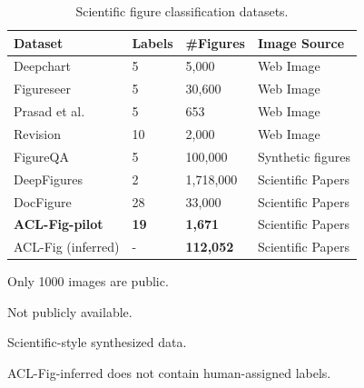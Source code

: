 \documentclass{article}
\newcommand{\scifig}{{\sc ACL-Fig}}
\newcommand{\scifigp}{{\sc ACL-Fig-pilot}}
\begin{document}
\begin{table}
\centering
\begin{threeparttable}[b]
\small
\centering
\caption{Scientific figure classification datasets. }
\label{Ch1-table:Stats}
\begin{tabular}{l|l|l|l} 
\toprule
Dataset                    & \textbf{Labels} & \textbf{\#Figures} & \textbf{Image Source}       \\ 
\midrule
Deepchart                  & 5               & 5,000               & Web Image                   \\
Figureseer\tnote{1}                 & 5               & 30,600             & Web Image                   \\
Prasad et al.              & 5               & 653                & Web Image                   \\
Revision                   & 10              & 2,000               & Web Image                   \\
FigureQA\tnote{3}                  & 5               & 100,000             & Synthetic figures           \\ 
\midrule
DeepFigures & 2 & 1,718,000 & Scientific Papers\\
DocFigure\tnote{2}                  & 28              & 33,000             & Scientific Papers           \\
\textbf{\scifigp}      & \textbf{19}     & \textbf{1,671}      & Scientific Papers  \\
{\scifig} (inferred)\tnote{4} & -               & \textbf{112,052}    & Scientific Papers \\
\bottomrule
\end{tabular}
\begin{tablenotes}
\item [1] {Only 1000 images are public}.
\item [2] {Not publicly available.}
\item [3] {Scientific-style synthesized data}.
\item [4] {\scifig}-inferred does not contain human-assigned labels.
\end{tablenotes}
\end{threeparttable}
\end{table}
\end{document}
